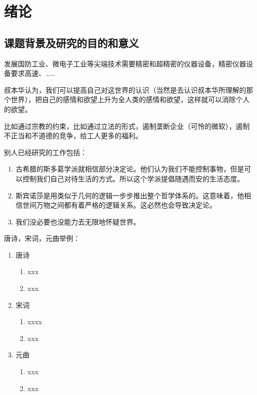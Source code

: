 
\clearpage
\setcounter{page}{1} 

\chapter{绪论}

\section{课题背景及研究的目的和意义}
发展国防工业、微电子工业等尖端技术需要精密和超精密的仪器设备，精密仪器设备要求高速、……


叔本华认为，我们可以提高自己对这世界的认识（当然是去认识叔本华所理解的那个世界），把自己的感情和欲望上升为全人类的感情和欲望，这样就可以消除个人的欲望\cite{chen2005laser,mittelbach2004latex}。

比如通过宗教的约束，比如通过立法的形式，遏制垄断企业（可怜的微软），遏制不正当\cite{arm}和不道德的竞争，给工人更多的福利\cite{mittelbach2004latex, arm,zhen2018leave}。

别人已经研究的工作包括：
\begin{enumerate}
	\item 古希腊的斯多葛学派就相信部分决定论。他们认为我们不能控制事物，但是可以控制我们自己对待生活的方式。所以这个学派提倡随遇而安的生活态度\cite{zhou2002nerualnet}。
	\item 斯宾诺莎是用类似于几何的逻辑一步步推出整个哲学体系的。这意味着，他相信世间万物之间都有着严格的逻辑关系。这必然也会导致决定论\cite{qi2020deeplearning}。
	\item 我们没必要也没能力去无限地怀疑世界\cite{partl2019short}。
\end{enumerate}

唐诗，宋词，元曲举例：
\begin{enumerate}
	\item 唐诗
	\begin{enumerate} 
		\item xxx
		\item xxx
	\end{enumerate}
	\item 宋词
	\begin{enumerate}
		\item xxxx
		\item xxx
	\end{enumerate}
	\item 元曲
	\begin{enumerate}
		\item xxx
		\item xxx
	\end{enumerate}
\end{enumerate}

